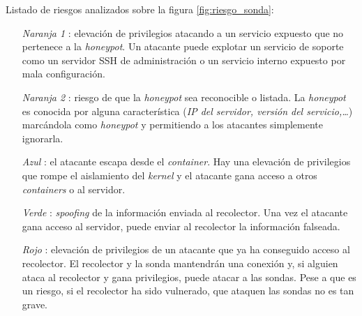 Listado de riesgos analizados sobre la figura \ref{fig:riesgo_sonda}:
\begin{enumerate}
    \item[\emph{Naranja 1}]: elevación de privilegios atacando a un servicio expuesto que no pertenece a la \emph{honeypot}. Un atacante puede explotar un servicio de soporte como un servidor SSH de administración o un servicio interno expuesto por mala configuración.
    \item[\emph{Naranja 2}]: riesgo de que la \emph{honeypot} sea reconocible o listada. La \emph{honeypot} es conocida por alguna característica (\emph{IP del servidor, versión del servicio,\ldots}) marcándola como \emph{honeypot} y permitiendo a los atacantes simplemente ignorarla.
    \item[\emph{Azul}]: el atacante escapa desde el \emph{container}. Hay una elevación de privilegios que rompe el aislamiento del \emph{kernel} y el atacante gana acceso a otros \emph{containers} o al servidor.
    \item[\emph{Verde}]: \emph{spoofing} de la información enviada al recolector. Una vez el atacante gana acceso al servidor, puede enviar al recolector la información falseada.
    \item[\emph{Rojo}]: elevación de privilegios de un atacante que ya ha conseguido acceso al recolector. El recolector y la sonda mantendrán una conexión y, si alguien ataca al recolector y gana privilegios, puede atacar a las sondas. Pese a que es un riesgo, si el recolector ha sido vulnerado, que ataquen las sondas no es tan grave.
\end{enumerate}

